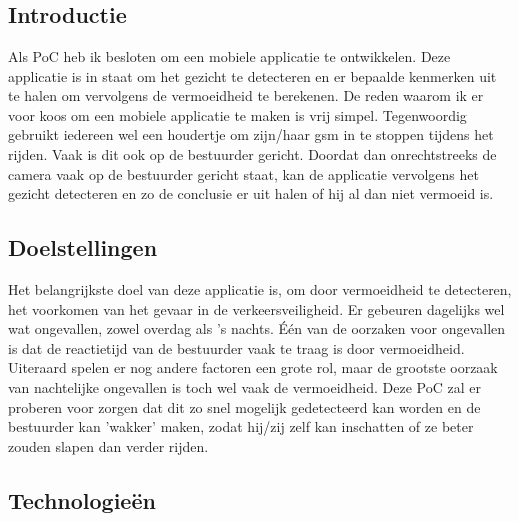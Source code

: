 \chapter{}%
\label{ch:proof-of-concept}
\section{Introductie}
Als PoC heb ik besloten om een mobiele applicatie te ontwikkelen. Deze applicatie is in staat om het gezicht te detecteren en er bepaalde kenmerken uit te halen om vervolgens de vermoeidheid te berekenen. De reden waarom ik er voor koos om een mobiele applicatie te maken is vrij simpel. Tegenwoordig gebruikt iedereen wel een houdertje om zijn/haar gsm in te stoppen tijdens het rijden. Vaak is dit ook op de bestuurder gericht. Doordat dan onrechtstreeks de camera vaak op de bestuurder gericht staat, kan de applicatie vervolgens het gezicht detecteren en zo de conclusie er uit halen of hij al dan niet vermoeid is.

\section{Doelstellingen}
Het belangrijkste doel van deze applicatie is, om door vermoeidheid te detecteren, het voorkomen van het gevaar in de verkeersveiligheid. Er gebeuren dagelijks wel wat ongevallen, zowel overdag als 's nachts. Één van de oorzaken voor ongevallen is dat de reactietijd van de bestuurder vaak te traag is door vermoeidheid. Uiteraard spelen er nog andere factoren een grote rol, maar de grootste oorzaak van nachtelijke ongevallen is toch wel vaak de vermoeidheid. Deze PoC zal er proberen voor zorgen dat dit zo snel mogelijk gedetecteerd kan worden en de bestuurder kan 'wakker' maken, zodat hij/zij zelf kan inschatten of ze beter zouden slapen dan verder rijden.

\section{Technologieën}
